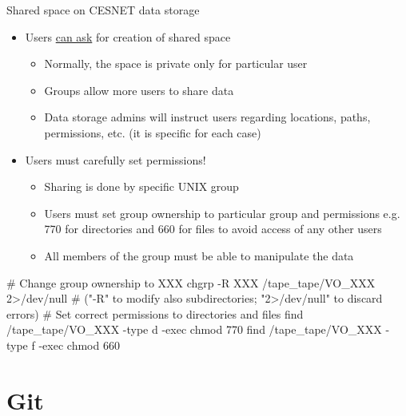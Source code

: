 \documentclass[compress, ucs, xelatex, 11pt, xcolor=svgnames, aspectratio=169,
	hyperref={
		bookmarks=true,
		unicode=true,
		colorlinks=true,
		pdftitle={Linux, command line and MetaCentrum},
		plainpages=false,
		pdfauthor={Vojtech Zeisek},
		pdfsubject={Course about use of Linux command line, writing shell scripts and using MetaCentrum of CESNET},
		pdfcreator={XeLaTeX},
		pdfkeywords={Linux, GNU, BASH, shell, command line, MetaCentrum},
		linkcolor=DarkRed, %
		anchorcolor=DarkBlue, %
		citecolor=Indigo, %
		filecolor=NavyBlue, %
		menucolor=DarkMagenta, %
		urlcolor=DarkBlue, %
		pdftex},
	url={hyphens, lowtilde} %
	]{beamer}
\begin{document}
\begin{frame}[fragile]{Shared space on CESNET data storage}
	\begin{itemize}
		\item Users \href{https://du.cesnet.cz/en/uzivatelska_podpora/start}{can ask} for creation of shared space
		\begin{itemize}
			\item Normally, the space is private only for particular user
			\item Groups allow more users to share data
			\item Data storage admins will instruct users regarding locations, paths, permissions, etc. (it is specific for each case)
		\end{itemize}
		\item Users must carefully set permissions!
		\begin{itemize}
			\item Sharing is done by specific UNIX group
			\item Users must set group ownership to particular group and permissions e.g. 770 for directories and 660 for files to avoid access of any other users
			\item All members of the group must be able to manipulate the data
		\end{itemize}
	\end{itemize}
	\vfill
	\begin{bashcode}
    # Change group ownership to XXX
    chgrp -R XXX /tape_tape/VO_XXX 2>/dev/null
    # ("-R" to modify also subdirectories; "2>/dev/null" to discard errors)
    # Set correct permissions to directories and files
    find /tape_tape/VO_XXX -type d -exec chmod 770 {} \;
    find /tape_tape/VO_XXX -type f -exec chmod 660 {} \;
	\end{bashcode}
\end{frame}

%

\section{Git}
\end{document}

